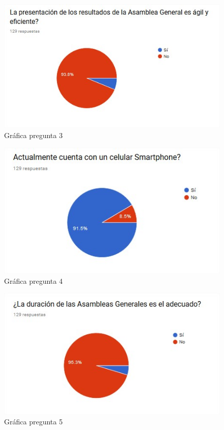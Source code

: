 
\begin{figure}[th!]
	\centering
	\includegraphics[width=0.7\linewidth]{desarrollo/resultados/imgs/pregunta-3}
	\caption{Gráfica pregunta 3}
\end{figure}


\begin{figure}[th!]
	\centering
	\includegraphics[width=0.7\linewidth]{desarrollo/resultados/imgs/pregunta-4}
	\caption{Gráfica pregunta 4}
\end{figure}


\begin{figure}[th!]
	\centering
	\includegraphics[width=0.7\linewidth]{desarrollo/resultados/imgs/pregunta-5}
	\caption{Gráfica pregunta 5}
\end{figure}


